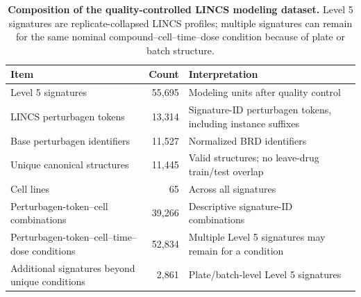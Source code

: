 \begin{table}[H]
\centering
\caption{\textbf{Composition of the quality-controlled LINCS modeling dataset.} Level 5 signatures are replicate-collapsed LINCS profiles; multiple signatures can remain for the same nominal compound--cell--time--dose condition because of plate or batch structure.}
\label{tab:datasetcomposition}
\begin{tabularx}{\textwidth}{@{}l r X@{}}
\toprule
Item & Count & Interpretation \\
\midrule
Level 5 signatures & 55,695 & Modeling units after quality control \\
LINCS perturbagen tokens & 13,314 & Signature-ID perturbagen tokens, including instance suffixes \\
Base perturbagen identifiers & 11,527 & Normalized BRD identifiers \\
Unique canonical structures & 11,445 & Valid structures; no leave-drug train/test overlap \\
Cell lines & 65 & Across all signatures \\
Perturbagen-token--cell combinations & 39,266 & Descriptive signature-ID combinations \\
Perturbagen-token--cell--time--dose conditions & 52,834 & Multiple Level 5 signatures may remain for a condition \\
Additional signatures beyond unique conditions & 2,861 & Plate/batch-level Level 5 signatures \\
\bottomrule
\end{tabularx}
\end{table}
